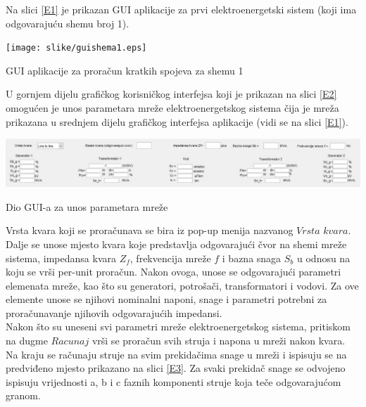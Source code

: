 \documentclass[a4paper, 12pt]{article}
\numberwithin{figure}{section}
\numberwithin{equation}{section}
\begin{document}
Na slici \ref{E1} je prikazan GUI aplikacije za prvi elektroenergetski sistem (koji ima odgovarajuću shemu broj 1). 

\begin{center}
    \captionsetup{type=figure}
    \begin{center}
        \texttt{[image: slike/guishema1.eps]}
        \caption{GUI aplikacije za proračun kratkih spojeva za shemu 1}
        \label{E1}
    \end{center}
\end{center}

U gornjem dijelu grafičkog korisničkog interfejsa koji je prikazan na slici \ref{E2} omogućen je unos parametara mreže elektroenergetskog sistema čija je mreža prikazana u srednjem dijelu grafičkog interfejsa aplikacije (vidi se na slici \ref{E1}). 

\begin{center}
    \captionsetup{type=figure}
    \begin{center}
        \includegraphics[width=\textwidth]{slike/shema1gui_gornji.eps}
        \caption{Dio GUI-a za unos parametara mreže}
        \label{E2}
    \end{center}
\end{center}

Vrsta kvara koji se proračunava se bira iz pop-up menija nazvanog $\textit{Vrsta kvara}$. Dalje se unose mjesto kvara koje predstavlja odgovarajući čvor na shemi mreže sistema, impedansa kvara $Z_{f}$, frekvencija mreže $f$ i bazna snaga $S_{b}$ u odnosu na koju se vrši per-unit proračun. Nakon ovoga, unose se odgovarajući parametri elemenata mreže, kao što su generatori, potrošači, transformatori i vodovi. Za ove elemente unose se njihovi nominalni naponi, snage i parametri potrebni za proračunavanje njihovih odgovarajućih impedansi.\\

Nakon što su uneseni svi parametri mreže elektroenergetskog sistema, pritiskom na dugme $\textit{Racunaj}$ vrši se proračun svih struja i napona u mreži nakon kvara. Na kraju se računaju struje na svim prekidačima snage u mreži i ispisuju se na predviđeno mjesto prikazano na slici \ref{E3}. Za svaki prekidač snage se odvojeno ispisuju vrijednosti a, b i c faznih komponenti struje koja teče odgovarajućom granom.
\end{document}
